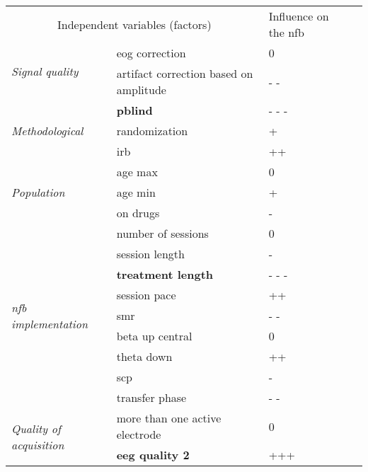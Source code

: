 \begin{center}
\begin{tabular}{ p{4cm} p{4cm} p{4cm} p{3cm} }
\toprule
\multicolumn{2}{c}{Independent variables (factors)} & Influence on the \gls{nfb} \\
\cmidrule(lr){1-2}\cmidrule(lr){3-3}
\multirow{ 2}{*}{ \textit{Signal quality} } & \gls{eog} correction & 0 \\ 
& artifact correction based on amplitude & - - \\ 
\cmidrule(lr){1-2}\cmidrule(lr){3-3}
\multirow{ 3}{*}{ \textit{Methodological} } & \textbf{\gls{pblind}} & - - -  \\ 
& randomization & + \\  
& \gls{irb} & ++ \\  
\cmidrule(lr){1-2}\cmidrule(lr){3-3}
\multirow{ 3}{*}{ \textit{Population} } & age max & 0 \\
& age min & + \\
& on drugs & - \\
\cmidrule(lr){1-2}\cmidrule(lr){3-3}
\multirow{ 9}{*}{ \textit{\gls{nfb} implementation} } & number of sessions  & 0 \\
& session length & - \\
& \textbf{treatment length} & - - - \\
& session pace & ++ \\ 
& \gls{smr} & - - \\
& beta up central & 0 \\  
& theta down & ++ \\
& \gls{scp} & - \\ 
& transfer phase & - - \\
\cmidrule(lr){1-2}\cmidrule(lr){3-3}
\multirow{ 2}{*}{ \textit{Quality of acquisition} } & more than one active electrode & 0 \\ 
& \textbf{\gls{eeg} quality 2} & +++ \\  
\bottomrule
\end{tabular}
\end{center}
